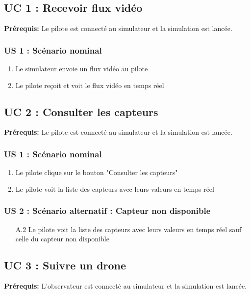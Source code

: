 \documentclass{scrartcl}
\begin{document}
\subsection{UC 1 : Recevoir flux vidéo}
\textbf{Prérequis:} Le pilote est connecté au simulateur et la simulation est lancée.

\subsubsection*{US 1 : Scénario nominal}
\begin{enumerate}
    \item Le simulateur envoie un flux vidéo au pilote
    \item Le pilote reçoit et voit le flux vidéo en temps réel
\end{enumerate}

\subsection{UC 2 : Consulter les capteurs}
\textbf{Prérequis:} Le pilote est connecté au simulateur et la simulation est lancée.

\subsubsection*{US 1 : Scénario nominal}
\begin{enumerate}
    \item Le pilote clique sur le bouton "Consulter les capteurs"
    \item Le pilote voit la liste des capteurs avec leurs valeurs en temps réel
\end{enumerate}

\subsubsection*{US 2 : Scénario alternatif : Capteur non disponible}
\begin{enumerate}
    \item[A.2] Le pilote voit la liste des capteurs avec leurs valeurs en temps réel sauf celle du capteur non disponible
\end{enumerate}

\subsection{UC 3 : Suivre un drone}
\textbf{Prérequis:} L'observateur est connecté au simulateur et la simulation est lancée.
\end{document}
